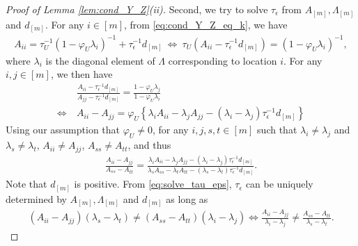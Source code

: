 \documentclass[11pt]{article}
\theoremstyle{definition}
\theoremstyle{remark}
\begin{document}
\begin{proof}[Proof of Lemma \ref{lem:cond_Y_Z}(ii)]
Second, we try to solve $\tau_{\epsilon}$ from $A_{[m]}, \Lambda_{[m]}$ and $d_{[m]}$. 
For any $i\in [m]$, from \eqref{eq:cond_Y_Z_eq_k}, we have 
\begin{align*}
    A_{ii} = \tau_U^{-1} (1- \varphi_U \lambda_i)^{-1} + \tau_\epsilon^{-1} d_{[m]}
    \ \Longleftrightarrow \ 
    \tau_U( A_{ii} - \tau_\epsilon^{-1} d_{[m]} ) = (1- \varphi_U \lambda_i)^{-1}, 
\end{align*}
where $\lambda_i$ is the diagonal element of $\Lambda$ corresponding to location $i$. 
For any $i,j\in [m]$, we then have 
\begin{align*}
    & \frac{A_{ii} - \tau_\epsilon^{-1} d_{[m]}}{A_{jj} - \tau_\epsilon^{-1} d_{[m]}}
    = 
    \frac{1- \varphi_U \lambda_j}{1- \varphi_U \lambda_i}
    \\
    \Longleftrightarrow \  & 
    A_{ii} - A_{jj} = \varphi_U  \left\{ \lambda_iA_{ii}- \lambda_j A_{jj} - 
    (\lambda_i -\lambda_j) \tau_\epsilon^{-1} d_{[m]} 
    \right\}
\end{align*}
Using our assumption that $\varphi_U \neq 0$, for any $i,j, s, t\in [m]$ such that $\lambda_i \ne \lambda_j$ and $\lambda_s \ne \lambda_t$, $A_{ii}\ne A_{jj}$, $A_{ss}\ne A_{tt}$, and thus
\begin{align}\label{eq:solve_tau_eps}
    \frac{A_{ii} - A_{jj}}{A_{ss} - A_{tt}} = 
    \frac{\lambda_iA_{ii}- \lambda_j A_{jj} - 
    (\lambda_i -\lambda_j) \tau_\epsilon^{-1} d_{[m]} 
    }{
    \lambda_sA_{ss}- \lambda_t A_{tt} - 
    (\lambda_s -\lambda_t) \tau_\epsilon^{-1} d_{[m]} 
    }.
\end{align}
Note that $d_{[m]}$ is positive. 
From \eqref{eq:solve_tau_eps}, $\tau_{\epsilon}$ can be uniquely determined by $A_{[m]}, \Lambda_{[m]}$ and $d_{[m]}$ as long as 
\begin{align*}
    (A_{ii}-A_{jj})(\lambda_s-\lambda_t) \ne (A_{ss} - A_{tt}) (\lambda_i -\lambda_j) 
    \Longleftrightarrow
    \frac{A_{ii}-A_{jj}}{\lambda_i -\lambda_j} \ne \frac{A_{ss} - A_{tt}}{\lambda_s-\lambda_t}. 
\end{align*}


\end{proof}
\end{document}
